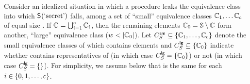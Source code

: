 Consider an idealized situation in which a procedure leaks the
equivalence class into which $\mathsf{S}_{}(\textrm{`secret'})$ falls, among a set
of \classesNmbr ``small'' equivalence classes $\mathbb{C}_{1}, \ldots
\mathbb{C}_{c}$ of equal size \classesSize.  If $\mathbb{C}_{} =
\bigcup_{i=1}^{c} \mathbb{C}_{i}$, then the
remaining elements $\mathbb{C}_{0} = \mathbb{S}\setminus\mathbb{C}_{}$
form another, ``large'' equivalence class
($w<\left|{\mathbb{C}_{0}}\right|$).  Let
$C_{S_{}}^{\textsf{sm}} \subseteq \{\mathbb{C}_{1}, \ldots,
\mathbb{C}_{c}\}$ denote the small equivalence classes of which
\secretsSet{} contains elements and $C_{S_{}}^{\textsf{lg}}
\subseteq \{\mathbb{C}_{0}\}$ indicate whether \secretsSet{} contains
representatives of  (in which case
$C_{S_{}}^{\textsf{lg}} = \{\mathbb{C}_{0}\}$) or not (in which
case $C_{S_{}}^{\textsf{lg}} = \{\}$).  For simplicity, we
assume below that \setSize{\possibleDoubles{\class{\classIdx}}} is the
same for each $i \in \{0, 1, \ldots, c\}$.

